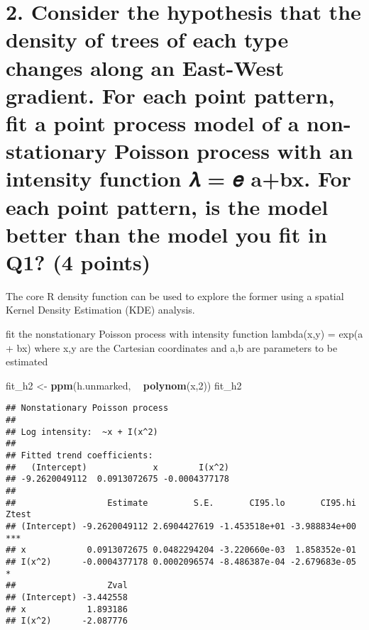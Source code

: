 \documentclass[]{article}
\newenvironment{Shaded}{\begin{snugshade}}{\end{snugshade}}
\newcommand{\DecValTok}[1]{\textcolor[rgb]{0.00,0.00,0.81}{#1}}
\newcommand{\KeywordTok}[1]{\textcolor[rgb]{0.13,0.29,0.53}{\textbf{#1}}}
\newcommand{\NormalTok}[1]{#1}
\newcommand{\OperatorTok}[1]{\textcolor[rgb]{0.81,0.36,0.00}{\textbf{#1}}}
\newcommand{\StringTok}[1]{\textcolor[rgb]{0.31,0.60,0.02}{#1}}
\begin{document}
\hypertarget{consider-the-hypothesis-that-the-density-of-trees-of-each-type-changes-along-an-east-west-gradient.-for-each-point-pattern-fit-a-point-process-model-of-a-non-stationary-poisson-process-with-an-intensity-function-ux1d706-ux1d452-abx.-for-each-point-pattern-is-the-model-better-than-the-model-you-fit-in-q1-4-points}{%
\section{2. Consider the hypothesis that the density of trees of each
type changes along an East-West gradient. For each point pattern, fit a
point process model of a non-stationary Poisson process with an
intensity function 𝜆 = 𝑒 a+bx. For each point pattern, is the model
better than the model you fit in Q1? (4
points)}\label{consider-the-hypothesis-that-the-density-of-trees-of-each-type-changes-along-an-east-west-gradient.-for-each-point-pattern-fit-a-point-process-model-of-a-non-stationary-poisson-process-with-an-intensity-function-ux1d706-ux1d452-abx.-for-each-point-pattern-is-the-model-better-than-the-model-you-fit-in-q1-4-points}}

The core R density function can be used to explore the former using a
spatial Kernel Density Estimation (KDE) analysis.

fit the nonstationary Poisson process with intensity function
lambda(x,y) = exp(a + bx) where x,y are the Cartesian coordinates and
a,b are parameters to be estimated

\begin{Shaded}
\begin{Highlighting}[]
\NormalTok{fit_h2 <-}\StringTok{ }\KeywordTok{ppm}\NormalTok{(h.unmarked, }\OperatorTok{~}\StringTok{ }\KeywordTok{polynom}\NormalTok{(x,}\DecValTok{2}\NormalTok{))}
\NormalTok{fit_h2}
\end{Highlighting}
\end{Shaded}

\begin{verbatim}
## Nonstationary Poisson process
## 
## Log intensity:  ~x + I(x^2)
## 
## Fitted trend coefficients:
##   (Intercept)             x        I(x^2) 
## -9.2620049112  0.0913072675 -0.0004377178 
## 
##                  Estimate         S.E.       CI95.lo       CI95.hi Ztest
## (Intercept) -9.2620049112 2.6904427619 -1.453518e+01 -3.988834e+00   ***
## x            0.0913072675 0.0482294204 -3.220660e-03  1.858352e-01      
## I(x^2)      -0.0004377178 0.0002096574 -8.486387e-04 -2.679683e-05     *
##                  Zval
## (Intercept) -3.442558
## x            1.893186
## I(x^2)      -2.087776
\end{verbatim}
\end{document}
